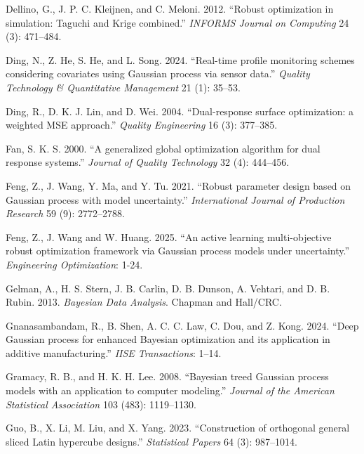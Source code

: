\documentclass[]{interact}
\theoremstyle{plain}%
\theoremstyle{definition}
\theoremstyle{remark}
\begin{document}
\begin{thebibliography}{}
Dellino, G., J. P. C. Kleijnen, and C. Meloni. 2012. ``Robust optimization in simulation: Taguchi and Krige combined.'' \emph{INFORMS Journal on Computing} 24 (3): 471--484.

Ding, N., Z. He, S. He, and L. Song. 2024. ``Real-time profile monitoring schemes considering covariates using Gaussian process via sensor data.'' \emph{Quality Technology \& Quantitative Management} 21 (1): 35--53.

Ding, R., D. K. J. Lin, and D. Wei. 2004. ``Dual-response surface optimization: a weighted MSE approach.'' \emph{Quality Engineering} 16 (3): 377--385.

Fan, S. K. S. 2000. ``A generalized global optimization algorithm for dual response systems.'' \emph{Journal of Quality Technology} 32 (4): 444--456.

Feng, Z., J. Wang, Y. Ma, and Y. Tu. 2021. ``Robust parameter design based on Gaussian process with model uncertainty.'' \emph{International Journal of Production Research} 59 (9): 2772--2788.

Feng, Z., J. Wang and W. Huang. 2025. ``An active learning multi-objective robust optimization framework via Gaussian process models under uncertainty.'' \emph{Engineering Optimization}: 1-24.

Gelman, A., H. S. Stern, J. B. Carlin, D. B. Dunson, A. Vehtari, and D. B. Rubin. 2013. \emph{Bayesian Data Analysis}. Chapman and Hall/CRC.

Gnanasambandam, R., B. Shen, A. C. C. Law, C. Dou, and Z. Kong. 2024. ``Deep Gaussian process for enhanced Bayesian optimization and its application in additive manufacturing.'' \emph{IISE Transactions}: 1--14.

Gramacy, R. B., and H. K. H. Lee. 2008. ``Bayesian treed Gaussian process models with an application to computer modeling.'' \emph{Journal of the American Statistical Association} 103 (483): 1119--1130.

Guo, B., X. Li, M. Liu, and X. Yang. 2023. ``Construction of orthogonal general sliced Latin hypercube designs.'' \emph{Statistical Papers} 64 (3): 987--1014.


\end{thebibliography}
\end{document}
